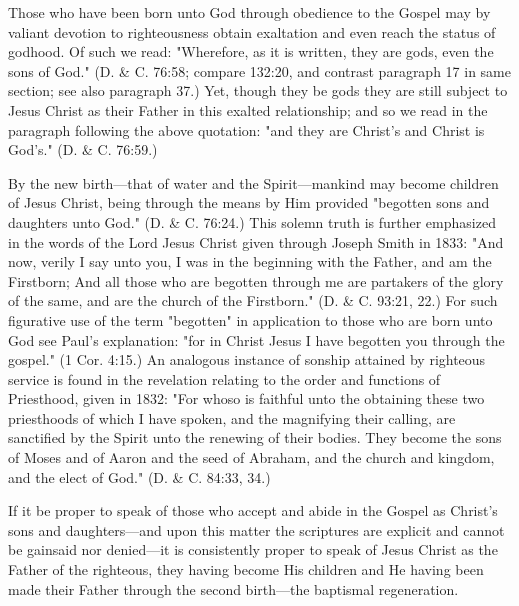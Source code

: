Those who have been born unto God through obedience to the Gospel may by valiant
devotion to righteousness obtain exaltation and even reach the status of godhood. Of such we
read: "Wherefore, as it is written, they are gods, even the sons of God." (D. \& C. 76:58;
compare 132:20, and contrast paragraph 17 in same section; see also paragraph 37.) Yet,
though they be gods they are still subject to Jesus Christ as their Father in this exalted
relationship; and so we read in the paragraph following the above quotation: "and they are
Christ's and Christ is God's." (D. \& C. 76:59.)

By the new birth—that of water and the Spirit—mankind may become children of Jesus
Christ, being through the means by Him provided "begotten sons and daughters unto God."
(D. \& C. 76:24.) This solemn truth is further emphasized in the words of the Lord Jesus
Christ given through Joseph Smith in 1833: "And now, verily I say unto you, I was in the
beginning with the Father, and am the Firstborn; And all those who are begotten through me
are partakers of the glory of the same, and are the church of the Firstborn." (D. \& C. 93:21,
22.) For such figurative use of the term "begotten" in application to those who are born unto
God see Paul's explanation: "for in Christ Jesus I have begotten you through the gospel." (1
Cor. 4:15.) An analogous instance of sonship attained by righteous service is found in the
revelation relating to the order and functions of Priesthood, given in 1832: "For whoso is
faithful unto the obtaining these two priesthoods of which I have spoken, and the magnifying
their calling, are sanctified by the Spirit unto the renewing of their bodies. They become the
sons of Moses and of Aaron and the seed of Abraham, and the church and kingdom, and the
elect of God." (D. \& C. 84:33, 34.)

If it be proper to speak of those who accept and abide in the Gospel as Christ's sons and
daughters—and upon this matter the scriptures are explicit and cannot be gainsaid nor
denied—it is consistently proper to speak of Jesus Christ as the Father of the righteous, they
having become His children and He having been made their Father through the second
birth—the baptismal regeneration.

